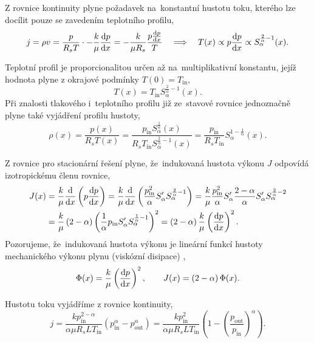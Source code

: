 Z rovnice kontinuity plyne požadavek na~konstantní hustotu toku, kterého lze docílit pouze se zavedením teplotního profilu,
\begin{equation}
    j=\rho v = \frac{p}{R_s T}\cdot-\frac{k}{\mu}\frac{\mathrm{d} p}{\mathrm{d} x}=-\frac{k}{\mu R_s}\frac{p\frac{\mathrm{d} p}{\mathrm{d} x}}{T}\quad\Longrightarrow \quad
    T(x)\propto p\frac{\mathrm{d} p}{\mathrm{d} x} \propto S_\alpha^{\frac{2}{\alpha}-1}(x).
\end{equation}

Teplotní profil je proporcionalitou určen až na~multiplikativní konstantu, jejíž hodnota plyne z okrajové podmínky $T(0)=T_{\mathrm{in}}$,
\begin{equation}
    T(x)=T_{\mathrm{in}}S_\alpha^{\frac{2}{\alpha}-1}(x).
\end{equation}
Při znalosti tlakového i~teplotního profilu již ze~stavové rovnice jednoznačně plyne také vyjádření profilu hustoty,
\begin{equation}
    \rho(x)=\frac{p(x)}{R_sT(x)}
    =\frac{p_{\mathrm{in}}S_\alpha^{\frac{1}{\alpha}}(x)}{R_s T_{\mathrm{in}}S_\alpha^{\frac{2}{\alpha}-1}(x)}
    =\frac{p_{\mathrm{in}}}{R_sT_{\mathrm{in}}}S_\alpha^{1-\frac{1}{\alpha}}(x).
\end{equation}

Z rovnice  pro stacionární řešení plyne, že~indukovaná hustota výkonu $J$ odpovídá izotropickému členu rovnice,
\begin{equation}
    \begin{split}
    J(x)
    &=\frac{k}{\mu}\frac{\mathrm{d} }{\mathrm{d} x}\left(p\frac{\mathrm{d} p}{\mathrm{d} x}\right)
    =\frac{k}{\mu}\frac{\mathrm{d} }{\mathrm{d} x}\left(\frac{p_{\mathrm{in}}^2}{\alpha}S'_\alpha S_\alpha^{\frac{2}{\alpha}-1}\right)
    =\frac{k}{\mu}\frac{p_{\mathrm{in}}^2}{\alpha}S'_\alpha\frac{2-\alpha}{\alpha}S'_\alpha S_\alpha^{\frac{2}{\alpha}-2}\\
    &=\frac{k}{\mu} \left(2-\alpha\right)\left(\frac{1}{\alpha}p_{\mathrm{in}} S'_\alpha S_\alpha^{\frac{1}{\alpha}-1}\right)^2
    =\left(2-\alpha\right)\frac{k}{\mu}\left(\frac{\mathrm{d} p}{\mathrm{d} x}\right)^2.
    \end{split}
\end{equation}
Pozorujeme, že~indukovaná hustota výkonu je lineární funkcí hustoty mechanického výkonu plynu (viskózní disipace) \Unit{\Phi}{\watt\per\cubic\meter},
\begin{equation}
    \Phi(x)=\frac{k}{\mu}\left(\frac{\mathrm{d} p}{\mathrm{d} x}\right)^2,\qquad J(x)=\left(2-\alpha\right)\Phi(x).
\end{equation}

Hustotu toku vyjádříme z rovnice kontinuity,
\begin{equation}\label{eq:pme_mass_flux}
    j=\frac{k p_{\mathrm{in}}^{2-\alpha}}{\alpha \mu R_s L T_{\mathrm{in}}}\left(p_{\mathrm{in}}^{\alpha}-p_{\mathrm{out}}^{\alpha}\right)
    =\frac{k p_{\mathrm{in}}^{2}}{\alpha \mu R_s L T_{\mathrm{in}}}\left(1-\left(\frac{p_{\mathrm{out}}}{p_{\mathrm{in}}}\right)^{\alpha}\right).
\end{equation}

